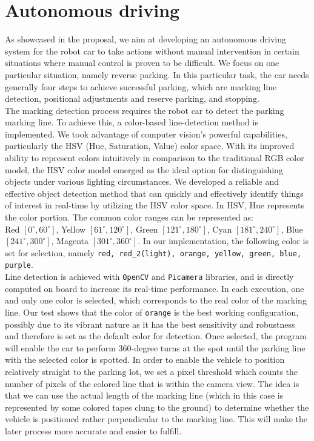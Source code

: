 \documentclass[acmsmall]{acmart}
\begin{document}
\section{Autonomous driving}
As showcased in the proposal, we aim at developing an autonomous driving system for the robot car to take actions without manual intervention in certain situations where manual control is proven to be difficult. We focus on one particular situation, namely reverse parking. In this particular task, the car needs generally four steps to achieve successful parking, which are marking line detection, positional adjustments and reserve parking, and stopping.\\
The marking detection process requires the robot car to detect the parking marking line. To achieve this, a color-based line-detection method is implemented. We took advantage of computer vision's powerful capabilities, particularly the HSV (Hue, Saturation, Value) color space. With its improved ability to represent colors intuitively in comparison to the traditional RGB color model, the HSV color model emerged as the ideal option for distinguishing objects under various lighting circumstances. We developed a reliable and effective object detection method that can quickly and effectively identify things of interest in real-time by utilizing the HSV color space. In HSV, Hue represents the color portion.\cite{HSV} The common color ranges can be represented as:\\
Red $[0^\circ,60^\circ]$, Yellow $[61^\circ,120^\circ]$, Green $[121^\circ,180^\circ]$, Cyan $[181^\circ,240^\circ]$, Blue $[241^\circ,300^\circ]$, Magenta $[301^\circ,360^\circ]$. In our implementation, the following color is set for selection, namely \texttt{red, red\_2(light), orange, yellow, green, blue, purple}. 
\\Line detection is achieved with \texttt{OpenCV} and \texttt{Picamera} libraries, and is directly computed on board to increase its real-time performance. In each execution, one and only one color is selected, which corresponds to the real color of the marking line. Our test shows that the color of \texttt{orange} is the best working configuration, possibly due to its vibrant nature as it has the best sensitivity and robustness and therefore is set as the default color for detection. Once selected, the program will enable the car to perform 360-degree turns at the spot until the parking line with the selected color is spotted. In order to enable the vehicle to position relatively straight to the parking lot, we set a pixel threshold which counts the number of pixels of the colored line that is within the camera view. The idea is that we can use the actual length of the marking line (which in this case is represented by some colored tapes clung to the ground) to determine whether the vehicle is positioned rather perpendicular to the marking line. This will make the later process more accurate and easier to fulfill.
\end{document}
